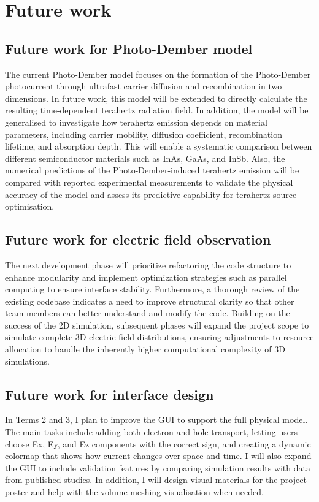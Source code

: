 \documentclass[12pt]{interim_report}
\begin{document}
\section{Future work}
\subsection{Future work for Photo-Dember model}
The current Photo-Dember model focuses on the formation of the Photo-Dember photocurrent through ultrafast carrier diffusion and recombination in two dimensions. In future work, this model will be extended to directly calculate the resulting time-dependent terahertz radiation field. In addition, the model will be generalised to investigate how terahertz emission depends on material parameters, including carrier mobility, diffusion coefficient, recombination lifetime, and absorption depth. This will enable a systematic comparison between different semiconductor materials such as InAs, GaAs, and InSb. Also, the numerical predictions of the Photo-Dember-induced terahertz emission will be compared with reported experimental measurements to validate the physical accuracy of the model and assess its predictive capability for terahertz source optimisation.
\subsection{Future work for electric field observation}
The next development phase will prioritize refactoring the code structure to enhance modularity and implement optimization strategies such as parallel computing to ensure interface stability. Furthermore, a thorough review of the existing codebase indicates a need to improve structural clarity so that other team members can better understand and modify the code. Building on the success of the 2D simulation, subsequent phases will expand the project scope to simulate complete 3D electric field distributions, ensuring adjustments to resource allocation to handle the inherently higher computational complexity of 3D simulations.
\subsection{Future work for interface design}
In Terms 2 and 3, I plan to improve the GUI to support the full physical model. The main tasks include adding both electron and hole transport, letting users choose Ex, Ey, and Ez components with the correct sign, and creating a dynamic colormap that shows how current changes over space and time. I will also expand the GUI to include validation features by comparing simulation results with data from published studies. In addition, I will design visual materials for the project poster and help with the volume-meshing visualisation when needed.
\newpage

\end{document}
